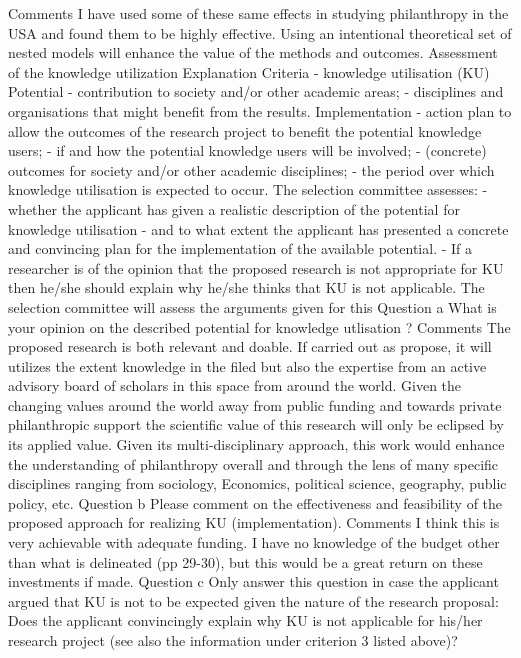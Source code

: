 \documentclass[twocolumn, serif, rga, numeric]{jote-article}
\begin{document}
Comments
I have used some of these same effects in studying philanthropy in the USA and found them to be highly effective.
Using an intentional theoretical set of nested models will enhance the value of the methods and outcomes.
Assessment of the knowledge utilization
Explanation
Criteria - knowledge utilisation (KU) Potential - contribution to society and/or other academic areas; - disciplines and organisations that might benefit from the results. Implementation - action plan to allow the outcomes of the research project to benefit the potential knowledge users; - if and how the potential knowledge users will be involved; - (concrete) outcomes for society and/or other academic disciplines; - the period over which knowledge utilisation is expected to occur. The selection committee assesses: - whether the applicant has given a realistic description of the potential for knowledge utilisation - and to what extent the applicant has presented a concrete and convincing plan for the implementation of the available potential. - If a researcher is of the opinion that the proposed research is not appropriate for KU then he/she should explain why he/she thinks that KU is not applicable. The selection committee will assess the arguments given for this
Question a
What is your opinion on the described potential for knowledge utlisation ?
Comments
The proposed research is both relevant and doable. If carried out as propose, it will utilizes the extent knowledge in the filed but also the expertise from an active advisory board of scholars in this space from around the world.
Given the changing values around the world away from public funding and towards private philanthropic support the scientific value of this research will only be eclipsed by its applied value.
Given its multi-disciplinary approach, this work would enhance the understanding of philanthropy overall and through the lens of many specific disciplines ranging from sociology, Economics, political science, geography, public policy, etc.
Question b
Please comment on the effectiveness and feasibility of the proposed approach for realizing KU (implementation).
Comments
I think this is very achievable with adequate funding. I have no knowledge of the budget other than what is delineated (pp 29-30), but this would be a great return on these investments if made.
Question c
Only answer this question in case the applicant argued that KU is not to be expected given the nature of the research proposal: Does the applicant convincingly explain why KU is not applicable for his/her research project (see also the information under criterion 3 listed above)?
\end{document}

